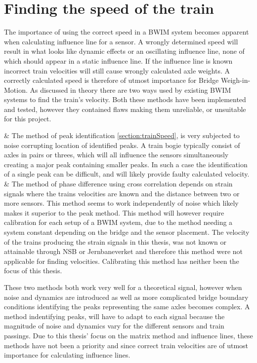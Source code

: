 \section{Finding the speed of the train}
The importance of using the correct speed in a BWIM system becomes apparent when calculating influence line for a sensor. A wrongly determined speed will result in what looks like dynamic effects or an oscillating influence line, none of which should appear in a static influence line. If the influence line is known incorrect train velocities will still cause wrongly calculated axle weights. A correctly calculated speed is therefore of utmost importance for Bridge Weigh-in-Motion.
As discussed in theory there are two ways used by existing BWIM systems to find the train's velocity. Both these methods have been implemented and tested, however they contained flaws making them unreliable, or unsuitable for this project.
\begin{easylist}[itemize]
 & The method of peak identification \ref{section:trainSpeed}, is very subjected to noise corrupting location of identified peaks. A train bogie typically consist of axles in pairs or threes, which will all influence the sensors simultaneously creating a major peak containing smaller peaks. In such a case the identification of a single peak can be difficult, and will likely provide faulty calculated velocity.
 & The method of phase difference using cross correlation depends on strain signals where the trains velocities are known and the distance between two or more sensors. This method seems to work independently of noise which likely makes it superior to the peak method. This method will however require calibration for each setup of a BWIM system, due to the method needing a system constant depending on the bridge and the sensor placement. The velocity of the trains producing the strain signals in this thesis, was not known or attainable through NSB or Jernbaneverket and therefore this method were not applicable for finding velocities. Calibrating this method has neither been the focus of this thesis.
\end{easylist}
These two methods both work very well for a theoretical signal, however when noise and dynamics are introduced as well as more complicated bridge boundary conditions identifying the peaks representing the same axles becomes complex. A method indentifying peaks, will have to adapt to each signal because the magnitude of noise and dynamics vary for the different sensors and train passings. Due to this thesis' focus on the matrix method and influence lines, these methods have not been a priority and since correct train velocities are of utmost importance for calculating influence lines.

